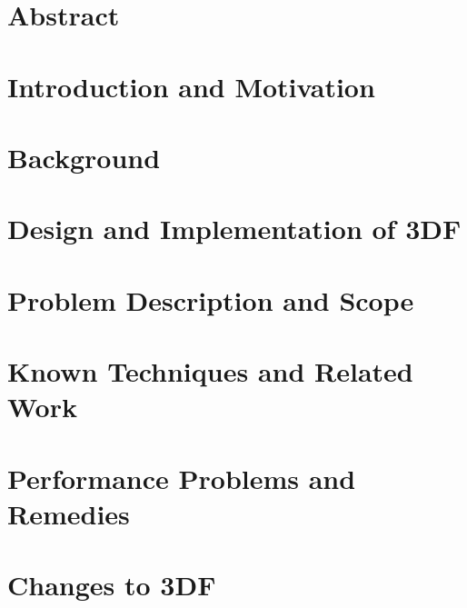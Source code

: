 \documentclass{article}
\begin{document}
\tableofcontents

\section{Abstract} \label{abstract}

\section{Introduction and Motivation} \label{intro}


\section{Background} \label{background}


\section{Design and Implementation of 3DF} \label{3df}


\section{Problem Description and Scope} \label{problem}


\section{Known Techniques and Related Work} \label{known-techniques}


\section{Performance Problems and Remedies} \label{catalog}


\section{Changes to 3DF} \label{implementation}




\end{document}
